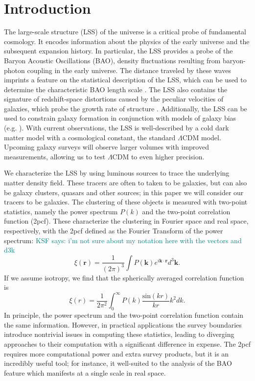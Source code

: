 \documentclass[modern]{aastex62}
\newcommand{\cf}{2pcf\xspace} %
\newcommand{\KSF}[1]{\textcolor{teal}{KSF says: #1}}
\begin{document}

\section{Introduction}

The large-scale structure (LSS) of the universe is a critical probe of fundamental cosmology. 
It encodes information about the physics of the early universe and the subsequent expansion history.
In particular, the LSS provides a probe of the Baryon Acoustic Oscillations (BAO), density fluctuations resulting from baryon-photon coupling in the early universe.
The distance traveled by these waves imprints a feature on the statistical description of the LSS, which can be used to determine the characteristic BAO length scale \citep{EisensteinHu1998}.
The LSS also contains the signature of redshift-space distortions caused by the peculiar velocities of galaxies, which probe the growth rate of structure \citep{Kaiser1987}.
Additionally, the LSS can be used to constrain galaxy formation in conjunction with models of galaxy bias (e.g. \citealt{Hamilton1988}). %
With current observations, the LSS is well-described by a cold dark matter model with a cosmological constant, the standard $\Lambda$CDM model.
Upcoming galaxy surveys will observe larger volumes with improved measurements, allowing us to test $\Lambda$CDM to even higher precision.

We characterize the LSS by using luminous sources to trace the underlying matter density field.
These tracers are often to taken to be galaxies, but can also be galaxy clusters, quasars and other sources; in this paper we will consider our tracers to be galaxies.
The clustering of these objects is measured with two-point statistics, namely the power spectrum $P(k)$ and the two-point correlation function (\cf).
These characterize the clustering in Fourier space and real space, respectively, with the \cf defined as the Fourier Transform of the power spectrum: 
\KSF{i'm not sure about my notation here with the vectors and d3k}
\begin{equation}
\xi(\mathbf{r}) = \frac{1}{(2\pi)^3} \int P(\mathbf{k}) e^{i\mathbf{k} \cdot \mathbf{r}} d^3\mathbf{k}.
\end{equation}
If we assume isotropy, we find that the spherically averaged correlation function is
\begin{equation}
\xi(r) = \frac{1}{2\pi^2} \int_0^{\infty} P(k) \frac{\mathrm{sin}(kr)}{kr} k^2 dk.
\end{equation}
In principle, the power spectrum and the two-point correlation function contain the same information.
However, in practical applications the survey boundaries introduce nontrivial issues in computing these statistics, leading to diverging approaches to their computation with a significant difference in expense.
The \cf requires more computational power and extra survey products, but it is an incredibly useful tool; for instance, it well-suited to the analysis of the BAO feature which manifests at a single scale in real space.
\end{document}

